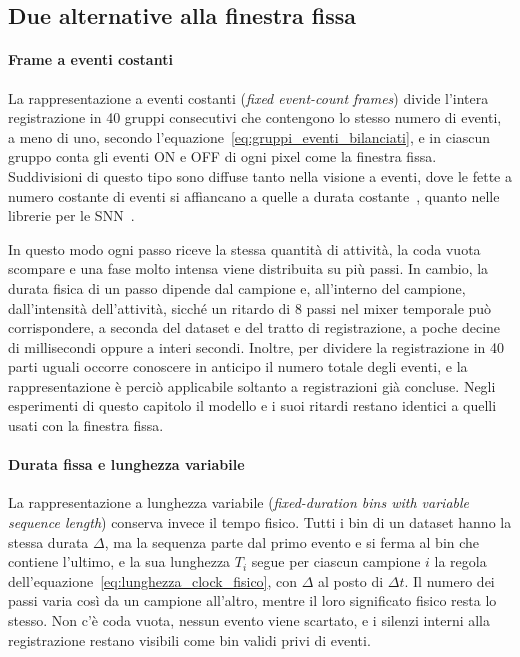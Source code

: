 \subsection{Due alternative alla finestra fissa}
\label{subsec:due_alternative}

\paragraph{Frame a eventi costanti}
\label{subsec:eventi_costanti}
La rappresentazione a eventi costanti (\emph{fixed event-count frames}) divide l'intera registrazione in 40 gruppi consecutivi che contengono lo stesso numero di eventi, a meno di uno, secondo l'equazione~\eqref{eq:gruppi_eventi_bilanciati}, e in ciascun gruppo conta gli eventi ON e OFF di ogni pixel come la finestra fissa. Suddivisioni di questo tipo sono diffuse tanto nella visione a eventi, dove le fette a numero costante di eventi si affiancano a quelle a durata costante~\cite{liu2018adaptive,gallego2022event}, quanto nelle librerie per le SNN~\cite{fang2023spikingjelly}.

In questo modo ogni passo riceve la stessa quantità di attività, la coda vuota scompare e una fase molto intensa viene distribuita su più passi. In cambio, la durata fisica di un passo dipende dal campione e, all'interno del campione, dall'intensità dell'attività, sicché un ritardo di 8 passi nel mixer temporale può corrispondere, a seconda del dataset e del tratto di registrazione, a poche decine di millisecondi oppure a interi secondi. Inoltre, per dividere la registrazione in 40 parti uguali occorre conoscere in anticipo il numero totale degli eventi, e la rappresentazione è perciò applicabile soltanto a registrazioni già concluse. Negli esperimenti di questo capitolo il modello e i suoi ritardi restano identici a quelli usati con la finestra fissa.

\paragraph{Durata fissa e lunghezza variabile}
\label{subsec:lunghezza_variabile}
La rappresentazione a lunghezza variabile (\emph{fixed-duration bins with variable sequence length}) conserva invece il tempo fisico. Tutti i bin di un dataset hanno la stessa durata $\Delta$, ma la sequenza parte dal primo evento e si ferma al bin che contiene l'ultimo, e la sua lunghezza $T_i$ segue per ciascun campione $i$ la regola dell'equazione~\eqref{eq:lunghezza_clock_fisico}, con $\Delta$ al posto di $\Delta t$. Il numero dei passi varia così da un campione all'altro, mentre il loro significato fisico resta lo stesso. Non c'è coda vuota, nessun evento viene scartato, e i silenzi interni alla registrazione restano visibili come bin validi privi di eventi.

